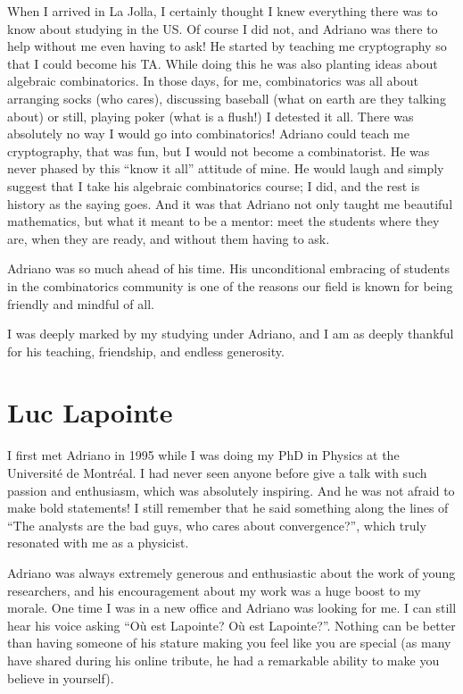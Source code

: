 \documentclass{notices}
\begin{document}
When I arrived in La Jolla, I certainly thought I knew everything there was to know about studying in the US. Of course I did not, and Adriano was there to help without me even having to ask!   He started by teaching me cryptography so that I could become his TA. While doing this he was also planting ideas about algebraic combinatorics. In those days, for me, combinatorics was all about arranging socks (who cares), discussing baseball (what on earth are they talking about) or still, playing poker (what is a flush!) I detested it all. There was absolutely no way I would go into combinatorics! Adriano could teach me cryptography, that was fun, but I would not become a combinatorist. He was never phased by this ``know it all'' attitude of mine. He would laugh and simply suggest that I take his algebraic combinatorics course; I did, and the rest is history as the saying goes. And it was that Adriano not only taught me beautiful mathematics, but what it meant to be a mentor: meet the students where they are, when they are ready, and without them having to ask.

Adriano was so much ahead of his time. His unconditional embracing of students in the combinatorics community is one of the reasons our field is known for being friendly and mindful of all.

I was deeply marked by my studying under Adriano, and I am as deeply thankful for his teaching, friendship, and endless generosity. 

\section*{Luc Lapointe}
I first met Adriano in 1995 while I was doing my PhD in Physics at the Université de Montréal.
I had never seen anyone before give a talk with such passion and enthusiasm, which was absolutely inspiring.
And he was not afraid to make bold statements! I still remember that he said something along the lines of ``The analysts are the bad guys, who cares about convergence?'', which truly resonated with me as a physicist.

Adriano was always extremely generous and enthusiastic about the work of young researchers, and his encouragement about my work was a huge boost to my morale. One time I was in a new office and Adriano was looking for me.  I can still hear his voice asking ``Où est Lapointe? Où est Lapointe?''.  Nothing can be better than having someone of his stature making you feel like you are special  (as many have shared during his online tribute, he had a remarkable ability to make you believe in yourself).
\end{document}
